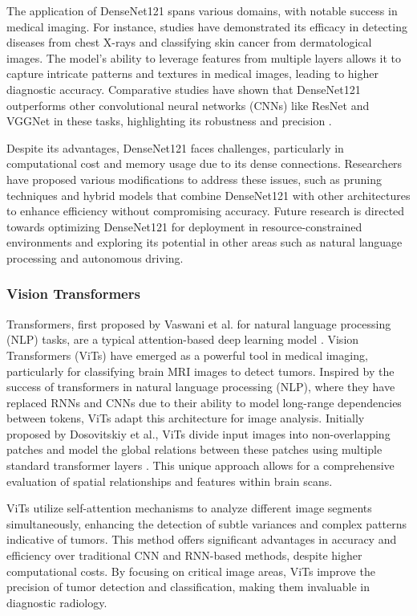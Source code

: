 The application of DenseNet121 spans various domains, with notable success in medical imaging. For instance, studies have demonstrated its efficacy in detecting diseases from chest X-rays\cite{chest_X-rays_2017} and classifying skin cancer\cite{skin_cancer_2017} from dermatological images. The model's ability to leverage features from multiple layers allows it to capture intricate patterns and textures in medical images, leading to higher diagnostic accuracy. Comparative studies have shown that DenseNet121 outperforms other convolutional neural networks (CNNs) like ResNet and VGGNet in these tasks, highlighting its robustness and precision .

Despite its advantages, DenseNet121 faces challenges, particularly in computational cost and memory usage due to its dense connections. Researchers have proposed various modifications to address these issues, such as pruning techniques\cite{Pruning_2019} and hybrid models that combine DenseNet121 with other architectures to enhance efficiency without compromising accuracy. Future research is directed towards optimizing DenseNet121\cite{Optimizing_2023} for deployment in resource-constrained environments and exploring its potential in other areas such as natural language processing and autonomous driving.

\subsubsection{Vision Transformers}

Transformers, first proposed by Vaswani et al. for natural language processing (NLP) tasks, are a typical attention-based deep learning model \cite{NIPS2017_3f5ee243}. Vision Transformers (ViTs) have emerged as a powerful tool in medical imaging, particularly for classifying brain MRI images to detect tumors. Inspired by the success of transformers in natural language processing (NLP), where they have replaced RNNs and CNNs due to their ability to model long-range dependencies between tokens, ViTs adapt this architecture for image analysis. Initially proposed by Dosovitskiy et al., ViTs divide input images into non-overlapping patches and model the global relations between these patches using multiple standard transformer layers \cite{dosovitskiy2021image}. This unique approach allows for a comprehensive evaluation of spatial relationships and features within brain scans.

ViTs utilize self-attention mechanisms to analyze different image segments simultaneously, enhancing the detection of subtle variances and complex patterns indicative of tumors. This method offers significant advantages in accuracy and efficiency over traditional CNN and RNN-based methods, despite higher computational costs. By focusing on critical image areas, ViTs improve the precision of tumor detection and classification, making them invaluable in diagnostic radiology.


